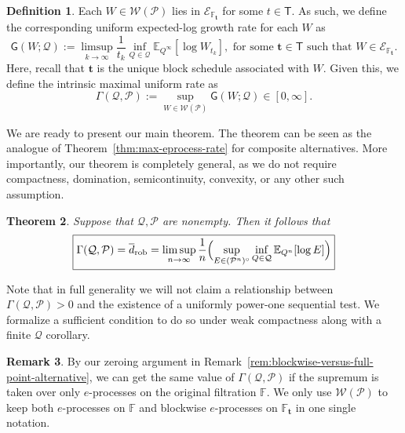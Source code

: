 \documentclass[11pt]{article}
\newcommand{\E}{\mathbb{E}}
\newcommand{\Pcal}{\mathcal{P}}
\newcommand{\Qcal}{\mathcal{Q}}
\newcommand{\bbF}{\mathbb F}
\newcommand{\bt}{\mathbf t}
\newcommand{\Tdet}{\mathsf T}
\newcommand{\Wcal}{\mathcal W}
\newtheorem{theorem}{Theorem}[section]
\theoremstyle{definition}
\newtheorem{definition}[theorem]{Definition}
\newtheorem{remark}[theorem]{Remark}
\theoremstyle{definition}
\begin{document}
\begin{definition}\label{def:uniform-growth-functional}
Each $W\in\Wcal(\Pcal)$ lies in $\mathcal E_{\bbF_{\bt}}$ for some $t\in\Tdet$. As such, we define the corresponding uniform expected-log growth rate for each $W$ as
\[
\mathsf G(W;\Qcal):=
\limsup_{k\to\infty} \frac{1}{t_k}\inf_{Q\in\Qcal}\E_{Q^\infty}[\log W_{t_k}],\text{ for some }\bt\in\Tdet\text{ such that $W\in\mathcal E_{\bbF_{\bt}}$}.
\]
Here, recall that $\bt$ is the unique block schedule associated with $W$. Given this, we define the intrinsic maximal uniform rate as
\[
\Gamma(\Qcal,\Pcal):=\sup_{W\in\Wcal(\Pcal)}\mathsf G(W;\Qcal) \in[0,\infty].
\]
\end{definition}

We are ready to present our main theorem. The theorem can be seen as the analogue of Theorem~\ref{thm:max-eprocess-rate} for composite alternatives. More importantly, our theorem is completely general, as we do not require compactness, domination, semicontinuity, convexity, or any other such assumption. 

\begin{theorem}\label{thm:composite-maxrate}
Suppose that $\Qcal, \Pcal$ are nonempty. Then it follows that
\[
\boxed{
\Gamma(\Qcal,\Pcal)=\overline d_{\mathrm{rob}}= \limsup_{n\to\infty}\frac{1}{n}\Bigl(\sup_{E\in(\Pcal^n)^\circ}\inf_{Q\in\Qcal}\E_{Q^n}[\log E]\Bigr)
}
\]
\end{theorem}

Note that in full generality we will not claim a relationship between $\Gamma(\Qcal,\Pcal)>0$ and the existence of a uniformly power-one sequential test. We formalize a sufficient condition to do so under weak compactness along with a finite $\Qcal$ corollary. 

\begin{remark}\label{rem:compositealternative-eproc-fulltime-sampletime}
By our zeroing argument in Remark~\ref{rem:blockwise-versus-full-point-alternative}, we can get the same value of $\Gamma(\Qcal,\Pcal)$ if the supremum is taken over only $e$-processes on the original filtration $\bbF$. We only use $\Wcal(\Pcal)$ to keep both $e$-processes on $\bbF$ and blockwise $e$-processes on $\bbF_{\bt}$ in one single notation.
\end{remark}
\end{document}
